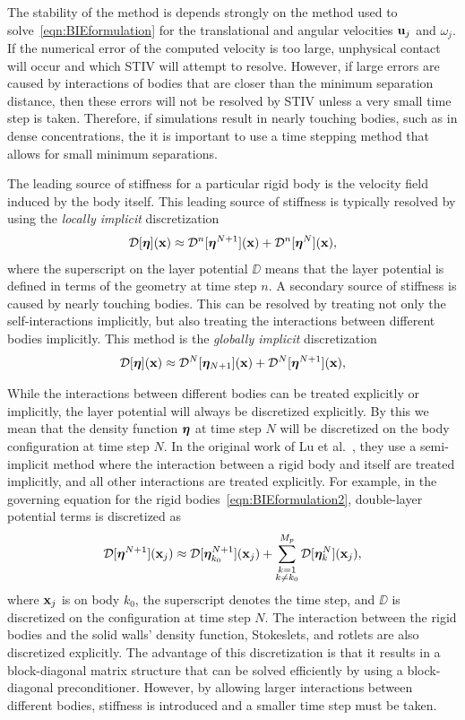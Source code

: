 \documentclass[preprint, 10pt]{elsarticle}
\begin{document}
The stability of the method is depends strongly on the method used to
solve~\eqref{eqn:BIEformulation} for the translational and angular
velocities ${\mathbf{u}}_j$ and $\omega_j$. If the numerical error of the
computed velocity is too large, unphysical contact will occur and
which STIV will attempt to resolve.  However, if large errors are caused
by interactions of bodies that are closer than the minimum separation
distance, then these errors will not be resolved by STIV unless a very
small time step is taken.  Therefore, if simulations result in nearly
touching bodies, such as in dense concentrations, the it is important to
use a time stepping method that allows for small minimum separations.

The leading source of stiffness for a particular rigid body
is the velocity field induced by the body itself. This leading source of
stiffness is typically resolved by using the {\em locally implicit}
discretization
\begin{align*}
  {\mathcal{D}}[{\boldsymbol\eta}]({\mathbf{x}}) \approx {\mathcal{D}}^{n}[{\boldsymbol\eta}^{N+1}]({\mathbf{x}}) +
  {\mathcal{D}}^{n}[{\boldsymbol\eta}^N]({\mathbf{x}}),
\end{align*}
where the superscript on the layer potential $\DD$ means that the layer
potential is defined in terms of the geometry at time step $n$.  A
secondary source of stiffness is caused by nearly touching bodies.  This
can be resolved by treating not only the self-interactions  implicitly,
but also treating the interactions between different bodies implicitly.
This method is the {\em globally implicit} discretization
\begin{align*}
  {\mathcal{D}}[{\boldsymbol\eta}]({\mathbf{x}}) \approx {\mathcal{D}}^{N}[{\boldsymbol\eta}_{N+1}]({\mathbf{x}}) +
  {\mathcal{D}}^{N}[{\boldsymbol\eta}^{N+1}]({\mathbf{x}}),
\end{align*}



While the interactions between
different bodies can be treated explicitly or implicitly, the layer
potential will always be discretized explicitly. By this we mean that
the density function ${\boldsymbol\eta}$ at time step $N$ will be discretized on the
body configuration at time step $N$.  In the original work of Lu et
al.~\cite{Lu2017}, they use a semi-implicit method where the interaction
between a rigid body and itself are treated implicitly, and all other
interactions are treated explicitly.  For example, in the governing
equation for the rigid bodies~\eqref{eqn:BIEformulation2}, double-layer
potential terms is discretized as
\begin{align}
 {\mathcal{D}}[{\boldsymbol\eta}^{N+1}]({\mathbf{x}}_j) \approx
  {\mathcal{D}}[{\boldsymbol\eta}^{N+1}_{k_0}]({\mathbf{x}}_j) + 
  \sum_{\substack{k=1 \\ k \neq k_0}}^{M_p} {\mathcal{D}}[{\boldsymbol\eta}^{N}_k]({\mathbf{x}}_j),
  \label{eqn:BlockImplicit}
\end{align}
where ${\mathbf{x}}_j$ is on body $k_0$, the superscript denotes the time
step, and $\DD$ is discretized on the configuration at time step $N$. The interaction between the
rigid bodies and the solid walls'
density function, Stokeslets, and rotlets are also discretized
explicitly.  The advantage of this discretization is that it results in
a block-diagonal matrix structure that can be solved efficiently by using a block-diagonal
preconditioner. However, by allowing
larger interactions between different bodies, stiffness is introduced
and a smaller time step must be taken. 
\end{document}
